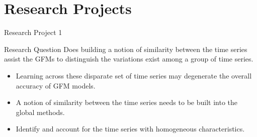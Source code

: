 \documentclass{beamer}
\begin{document}
 
\section{Research Projects}

    
\begin{frame}{Research Project 1}
   \begin{block}{Research Question}	
	Does building a notion of similarity between the time series assist the GFMs to distinguish the variations exist among a group of time series.
	\end{block}
	\vspace{0.8mm}
	\begin{itemize}
	\item Learning across these disparate set of time series may degenerate the overall accuracy of GFM models.
	\item A notion of similarity between the time series needs to be built into the global methods.
	\item Identify and account for the time series with homogeneous characteristics.
	\end{itemize}
\end{frame}  
\end{document}
